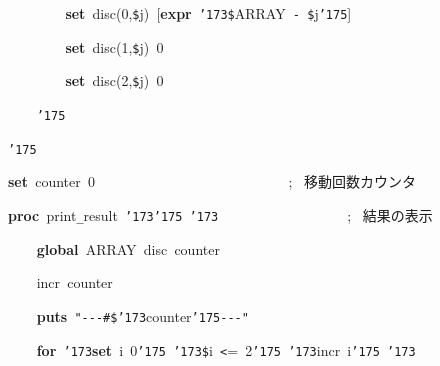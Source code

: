 \documentclass[a4paper,10pt]{article}
\def\mc{\relax}
\begin{document}
\noindent
\mbox{}{\tt\mc \ }{\tt\mc \ }{\tt\mc \ }{\tt\mc \ }{\tt\mc \ }{\tt\mc \ }{\tt\mc \ }{\tt\mc \ }\textbf{set}{\tt\mc \ }disc(0,{\tt\$}j){\tt\mc \ }[\textbf{expr}{\tt\mc \ }{\tt\char'173}{\tt\$}ARRAY{\tt\mc \ }{\tt -}{\tt\mc \ }{\tt\$}j{\tt\char'175}]

\noindent
\mbox{}{\tt\mc \ }{\tt\mc \ }{\tt\mc \ }{\tt\mc \ }{\tt\mc \ }{\tt\mc \ }{\tt\mc \ }{\tt\mc \ }\textbf{set}{\tt\mc \ }disc(1,{\tt\$}j){\tt\mc \ }0

\noindent
\mbox{}{\tt\mc \ }{\tt\mc \ }{\tt\mc \ }{\tt\mc \ }{\tt\mc \ }{\tt\mc \ }{\tt\mc \ }{\tt\mc \ }\textbf{set}{\tt\mc \ }disc(2,{\tt\$}j){\tt\mc \ }0

\noindent
\mbox{}{\tt\mc \ }{\tt\mc \ }{\tt\mc \ }{\tt\mc \ }{\tt\char'175}

\noindent
\mbox{}{\tt\char'175}

\noindent
\mbox{}\hfill

\noindent
\mbox{}\textbf{set}{\tt\mc \ }counter{\tt\mc \ }0{\tt\mc \ }{\tt\mc \ }{\tt\mc \ }{\tt\mc \ }{\tt\mc \ }{\tt\mc \ }{\tt\mc \ }{\tt\mc \ }{\tt\mc \ }{\tt\mc \ }{\tt\mc \ }{\tt\mc \ }{\tt\mc \ }{\tt\mc \ }{\tt\mc \ }{\tt\mc \ }{\tt\mc \ }{\tt\mc \ }{\tt\mc \ }{\tt\mc \ }{\tt\mc \ }{\tt\mc \ }{\tt\mc \ }{\tt\mc \ }{\tt\mc \ }{\tt\mc \ }{\tt\mc \ };\rm\mc {\tt\#} \ 移動回数カウンタ \hfill 
\tt\mc 

\noindent
\mbox{}\hfill

\noindent
\mbox{}\textbf{proc}{\tt\mc \ }print{\tt\_}result{\tt\mc \ }{\tt\char'173}{\tt\char'175}{\tt\mc \ }{\tt\char'173}{\tt\mc \ }{\tt\mc \ }{\tt\mc \ }{\tt\mc \ }{\tt\mc \ }{\tt\mc \ }{\tt\mc \ }{\tt\mc \ }{\tt\mc \ }{\tt\mc \ }{\tt\mc \ }{\tt\mc \ }{\tt\mc \ }{\tt\mc \ }{\tt\mc \ }{\tt\mc \ }{\tt\mc \ }{\tt\mc \ };\rm\mc {\tt\#} \ 結果の表示 \hfill 
\tt\mc 

\noindent
\mbox{}{\tt\mc \ }{\tt\mc \ }{\tt\mc \ }{\tt\mc \ }\textbf{global}{\tt\mc \ }ARRAY{\tt\mc \ }disc{\tt\mc \ }counter

\noindent
\mbox{}{\tt\mc \ }{\tt\mc \ }{\tt\mc \ }{\tt\mc \ }incr{\tt\mc \ }counter

\noindent
\mbox{}{\tt\mc \ }{\tt\mc \ }{\tt\mc \ }{\tt\mc \ }\textbf{puts}{\tt\mc \ }{\tt "}{\tt -}{\tt -}{\tt -}{\tt\#}{\tt\$}{\tt\char'173}counter{\tt\char'175}{\tt -}{\tt -}{\tt -}{\tt "}

\noindent
\mbox{}{\tt\mc \ }{\tt\mc \ }{\tt\mc \ }{\tt\mc \ }\textbf{for}{\tt\mc \ }{\tt\char'173}\textbf{set}{\tt\mc \ }i{\tt\mc \ }0{\tt\char'175}{\tt\mc \ }{\tt\char'173}{\tt\$}i{\tt\mc \ }{\tt <}={\tt\mc \ }2{\tt\char'175}{\tt\mc \ }{\tt\char'173}incr{\tt\mc \ }i{\tt\char'175}{\tt\mc \ }{\tt\char'173}
\end{document}
